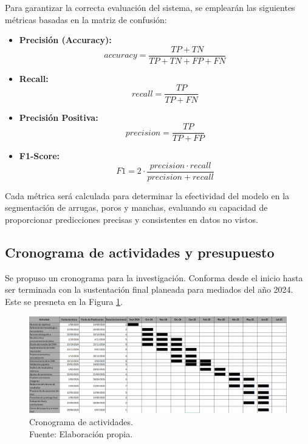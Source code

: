 Para garantizar la correcta evaluación del sistema, se emplearán las siguientes métricas basadas en la matriz de confusión:
\begin{itemize}
    \item \textbf{Precisión (Accuracy):} \[ accuracy = \frac{TP + TN}{TP + TN + FP + FN} \]
    \item \textbf{Recall:} \[ recall = \frac{TP}{TP + FN} \]
    \item \textbf{Precisión Positiva:} \[ precision = \frac{TP}{TP + FP} \]
    \item \textbf{F1-Score:} \[ F1 = 2 \cdot \frac{precision \cdot recall}{precision + recall} \]
\end{itemize}

Cada métrica será calculada para determinar la efectividad del modelo en la segmentación de arrugas, poros y manchas, evaluando su capacidad de proporcionar predicciones precisas y consistentes en datos no vistos.

\begin{landscape}
	\section{Cronograma de actividades y presupuesto}
	Se propuso un cronograma para la investigación. Conforma desde el inicio hasta ser terminada con la sustentación final planeada para mediados del año 2024. Este se presneta en la Figura \ref{3:fig303}.

	\begin{figure}[!ht]
		\begin{center}
			\includegraphics[width=1.50\textwidth]{3/figures/gant.png}
			\caption[Cronograma de actividades]{Cronograma de actividades.\\
				Fuente: Elaboración propia.}
			\label{3:fig303}
		\end{center}
	\end{figure}
	
\end{landscape}

